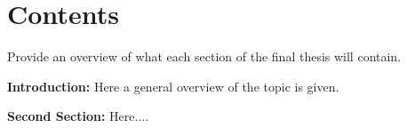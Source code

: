 \section{Contents}
\label{sec:contents}

Provide an overview of what each section of the final thesis will contain.

\textbf{Introduction:} Here a general overview of the topic is given.

\textbf{Second Section:} Here....